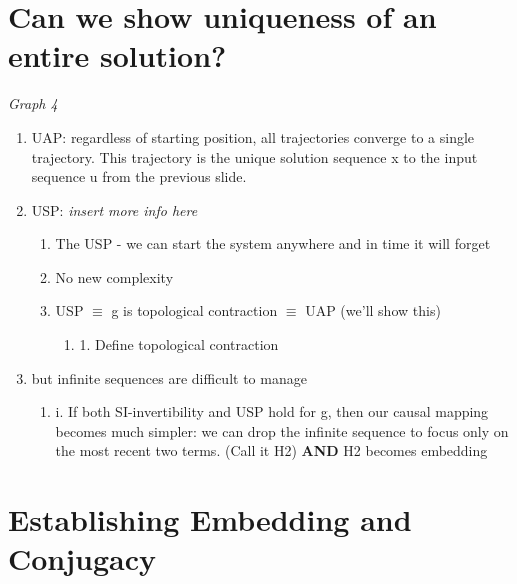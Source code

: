 \documentclass[12pt, oneside]{article}
\theoremstyle{definition}
\begin{document}
\section{Can we show uniqueness of an entire solution?}

\emph{Graph 4}

\begin{enumerate}
  \item UAP: regardless of starting position, all trajectories converge to a single trajectory. This
  trajectory is the unique solution sequence x to the input sequence u from the previous
  slide.
  \item  USP: \emph{insert more info here}
  \begin{enumerate}
      \item The USP - we can start the system anywhere and in time it will forget
      \item  No new complexity
      \item USP $\equiv$ g is topological contraction $\equiv$ UAP (we’ll show this) 
      \begin{enumerate}
            \item 1. Define topological contraction      
      \end{enumerate}
  \end{enumerate}
  \item but infinite sequences are difficult to manage
  \begin{enumerate}
      \item   i. If both SI-invertibility and USP hold for g, then our causal mapping becomes much simpler: we can drop the infinite sequence to focus only on the most recent two terms. (Call it H2)
      \newline \textbf{AND} H2 becomes embedding    
  \end{enumerate}
\end{enumerate}

\section{Establishing Embedding and Conjugacy}
\end{document}
